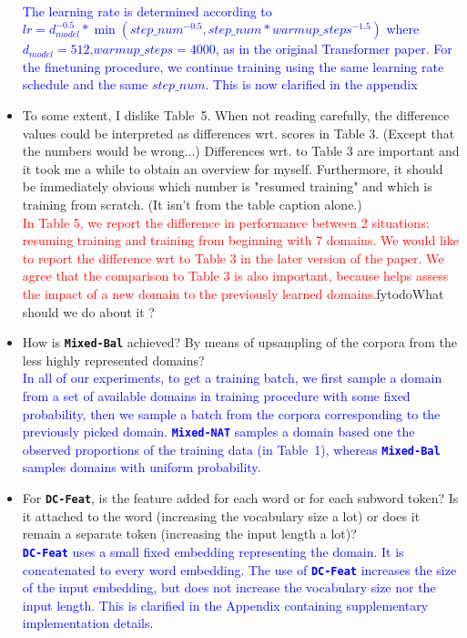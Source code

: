 \documentclass[12pt,times,a4paper,twoside]{article}
\newcommand{\fyDone}[1]{\done[FY]\Todo[FY:]{\textcolor{orange}{#1}}}
\theoremstyle{definition}
\newcommand{\system}[1]{\texttt{\textbf{#1}}}
\begin{document}
\begin{itemize}
\\
\textcolor{blue}{The learning rate is determined according to $lr = d_{model}^{-0.5}*\min(step\_num^{-0.5},step\_num * warmup\_steps^{-1.5})$ where $d_{model}=512$,$warmup\_steps=4000$, as in the original Transformer paper. For the finetuning procedure, we continue training using the same learning rate schedule and the same $step\_num$. This is now clarified in the appendix}\fyDone{Fix this, add comments in appendix}
\\
\item To some extent, I dislike Table~5. When not reading carefully, the difference values could be interpreted as differences wrt. scores in Table 3. (Except that the numbers would be wrong...) Differences wrt. to Table 3 are important and it took me a while to obtain an overview for myself. Furthermore, it should be immediately obvious which number is "resumed training" and which is training from scratch. (It isn't from the table caption alone.)
\\
\textcolor{red}{In Table 5, we report the difference in performance between 2 situations: resuming training and training from beginning with 7 domains. We would like to report the difference wrt to Table 3 in the later version of the paper. We agree that the comparison to Table 3 is also important, because helps assess the impact of a new domain to the previously learned domains.}fytodo{What should we do about it ?}
\\
\item How is \system{Mixed-Bal} achieved? By means of upsampling of the corpora from the less highly represented domains?
\\
\textcolor{blue}{In all of our experiments, to get a training batch, we first sample a domain from a set of available domains in training procedure with some fixed probability, then we sample a batch from the corpora corresponding to the previously picked domain. \system{Mixed-NAT} samples a domain based one the observed proportions of the training data (in Table~1), whereas \system{Mixed-Bal} samples domains with uniform probability.}
\\
\item For \system{DC-Feat}, is the feature added for each word or for each subword token? Is it attached to the word (increasing the vocabulary size a lot) or does it remain a separate token (increasing the input length a lot)?
\\
\textcolor{blue}{\system{DC-Feat} uses a small fixed embedding representing the domain. It is concatenated to every word embedding. The use of \system{DC-Feat} increases the size of the input embedding, but does not increase the vocabulary size nor the input length. This is clarified in the Appendix containing supplementary implementation details.}

\end{itemize}
\end{document}
